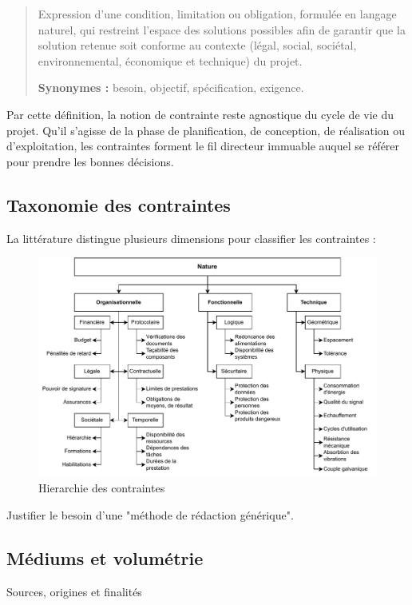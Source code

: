 \documentclass[a4paper,12pt]{article}
\begin{document}
\label{org54f7041}
\begin{verse}
Expression d'une condition, limitation ou obligation, formulée en langage naturel, qui restreint l’espace des solutions possibles afin de garantir que la solution retenue soit conforme au contexte (légal, social, sociétal, environnemental, économique et technique) du projet.

\textbf{Synonymes :} besoin, objectif, spécification, exigence.\\
\end{verse}

Par cette définition, la notion de contrainte reste agnostique du cycle de vie du projet. Qu’il s’agisse de la phase de planification, de conception, de réalisation ou d’exploitation, les contraintes forment le fil directeur immuable auquel se référer pour prendre les bonnes décisions.
\subsection{Taxonomie des contraintes}
\label{sec:orgdfa311b}

La littérature distingue plusieurs dimensions pour classifier les contraintes :

\begin{figure}[htbp]
\centering
\includegraphics[width=.9\linewidth]{./svg/taxonomie.pdf}
\caption{\label{fig:org2c4d178}Hierarchie des contraintes}
\end{figure}

Justifier le besoin d'une "méthode de rédaction générique".
\subsection{Médiums et volumétrie}
\label{sec:orge67da01}
Sources, origines et finalités
\end{document}
